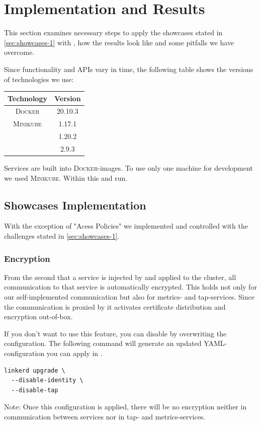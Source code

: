 \section{Implementation and Results}

This section examines necessary steps to apply the showcases stated in \autoref{sec:showcases-1} with \linkerd{}, how the results look like and some pitfalls we have overcome.

Since functionality and APIs vary in time, the following table shows the versions of technologies we use:
\begin{table}[h]
\centering	
\begin{tabular}{c|c}
	Technology & Version \\\hline
	\textsc{Docker} & 20.10.3\\\hline
	\textsc{Minikube} & 1.17.1\\\hline
	\kubernetes & 1.20.2\\\hline
	\linkerd & 2.9.3 \\
\end{tabular}
\vspace{0.25mm}
\label{tab:versions}
\end{table}

Services are built into \textsc{Docker}-images.
To use only one machine for development we used \textsc{Minikube}.
Within this \kubernetes{} and \linkerd{} run.

\subsection{Showcases Implementation}
With the exception of "Acess Policies" we implemented and controlled with \linkerd{} the challenges stated in \autoref{sec:showcases-1}.

\subsubsection{Encryption}
From the second that a service is injected by \linkerd{} and applied to the cluster, all communication to that service is automatically encrypted.
This holds not only for our self-implemented communication but also for metrics- and tap-services.
Since the communication is proxied by \linkerd{} it activates certificate distribution and encryption out-of-box.

If you don't want to use this feature, you can disable by overwriting the \linkerd{} configuration.
The following command will generate an updated YAML-configuration you can apply in \kubernetes{}.
\begin{lstlisting}
linkerd upgrade \
  --disable-identity \
  --disable-tap
\end{lstlisting}
Note: Once this configuration is applied, there will be no encryption neither in communication between services nor in tap- and metrics-services.

